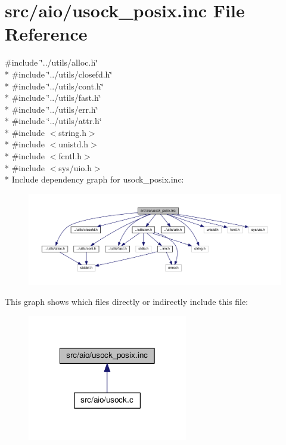 \hypertarget{usock__posix_8inc}{}\section{src/aio/usock\+\_\+posix.inc File Reference}
\label{usock__posix_8inc}
{\ttfamily \#include \char`\"{}../utils/alloc.\+h\char`\"{}}\\*
{\ttfamily \#include \char`\"{}../utils/closefd.\+h\char`\"{}}\\*
{\ttfamily \#include \char`\"{}../utils/cont.\+h\char`\"{}}\\*
{\ttfamily \#include \char`\"{}../utils/fast.\+h\char`\"{}}\\*
{\ttfamily \#include \char`\"{}../utils/err.\+h\char`\"{}}\\*
{\ttfamily \#include \char`\"{}../utils/attr.\+h\char`\"{}}\\*
{\ttfamily \#include $<$string.\+h$>$}\\*
{\ttfamily \#include $<$unistd.\+h$>$}\\*
{\ttfamily \#include $<$fcntl.\+h$>$}\\*
{\ttfamily \#include $<$sys/uio.\+h$>$}\\*
Include dependency graph for usock\+\_\+posix.\+inc\+:\nopagebreak
\begin{figure}[H]
\begin{center}
\leavevmode
\includegraphics[width=350pt]{usock__posix_8inc__incl}
\end{center}
\end{figure}
This graph shows which files directly or indirectly include this file\+:\nopagebreak
\begin{figure}[H]
\begin{center}
\leavevmode
\includegraphics[width=198pt]{usock__posix_8inc__dep__incl}
\end{center}
\end{figure}
